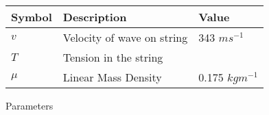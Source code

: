 \setlength{\arrayrulewidth}{0.3mm}
\setlength{\tabcolsep}{15pt}
\renewcommand{\arraystretch}{1.5}



\begin{tabular}{ |p{1cm}|p{3cm}|p{1cm}| }
\hline
Symbol & Description & Value\\
\hline
$v$ & Velocity of wave on string & 343 $ms^{-1}$\\
\hline
$T$ & Tension in the string& \\
\hline
$\mu$ & Linear Mass Density & 0.175 $kgm^{-1}$\\
\hline
\end{tabular}
\caption{Parameters}
